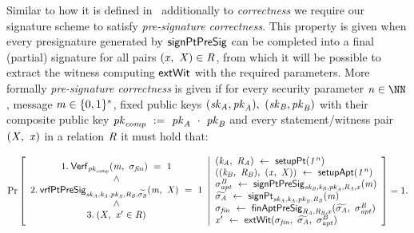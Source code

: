 \begin{definition}\label{def:preSigCorrectness}
Similar to how it is defined in~\cite{aumayr2020bitcoinchannels} additionally to \textit{correctness} we require our signature scheme to satisfy \textit{pre-signature correctness}.
This property is given when every presignature generated by $\mathsf{signPtPreSig}$ can be completed into a final (partial) signature for all pairs $(\mathit{x} ,~ \mathit{X}) \in \mathit{R}$, from which it will
be possible to extract the witness computing $\mathsf{extWit}$ with the required parameters.
More formally \textit{pre-signature correctness} is given if for every security parameter $\varN \in \cnstNatural$, message $\mathit{m} \in \{0,1\}^{*}$, fixed public keys $(\mathit{sk}_{\mathit{A}}, \mathit{pk}_{\mathit{A}}) ,~ (\mathit{sk}_{\mathit{B}}, \mathit{pk}_{\mathit{B}})$
with their composite public key $\mathit{pk}_{\mathit{comp}} ~:=~ \mathit{pk}_{\mathit{A}} ~\cdot~ \mathit{pk}_{\mathit{B}}$ and every statement/witness pair $(\mathit{X} ,~ \mathit{x})$ in a relation $\mathit{R}$ it must hold that:
\begin{scriptsize}
    \[
        \Pr\left[
        \begin{array}{c}
            1.\:\mathsf{Verf}_{\mathit{pk}_{\mathit{comp}}}(\mathit{m} ,~ \sigma_{\mathit{fin}}) ~=~ 1 \\
            ~\land~ \\
            2.\:\mathsf{vrfPtPreSig}_{\mathit{sk}_{\mathit{A}},\mathit{\mathit{k}_{\mathit{A}}},\mathit{pk}_{\mathit{B}},\mathit{R}_{\mathit{B}},\widetilde{\sigma_{\mathit{B}}}}(\mathit{m} ,~ \mathit{X}) ~=~ 1 \\
            ~\land~ \\
            3.\:(\mathit{X} ,~ \mathit{x}' \in \mathit{R})
        \end{array}
        \middle\vert
        \begin{array}{l}
            (\mathit{\mathit{k}_{\mathit{A}}} ,~ \mathit{R}_{\mathit{A}}) ~\leftarrow~ \mathsf{setupPt} (\mathit{1^n}) \\
            ((\mathit{\mathit{k}_{\mathit{B}}} ,~ \mathit{R}_{\mathit{B}}) ,~ (\mathit{x} ,~ \mathit{X})) ~\leftarrow~ \mathsf{setupApt}(\mathit{1^n}) \\
            \sigma^{\mathit{B}}_{\mathit{apt}} ~\leftarrow~ \mathsf{signPtPreSig}_{\mathit{sk}_{\mathit{B}},\mathit{\mathit{k}_{\mathit{B}}},\mathit{pk}_{\mathit{A}},\mathit{R}_{\mathit{A}},\mathit{x}}(\mathit{m}) \\
            \widetilde{\sigma_{\mathit{A}}} ~\leftarrow~ \mathsf{signPt}_{\mathit{sk}_{\mathit{A}},\mathit{\mathit{k}_{\mathit{A}}},\mathit{pk}_{\mathit{B}},\mathit{R}_{\mathit{B}}}(\mathit{m}) \\
            \sigma_{\mathit{fin}} ~\leftarrow~ \mathsf{finAptPreSig}_{\mathit{R}_{\mathit{A}},\mathit{R}_{\mathit{B}},\mathit{x}}(\widetilde{\sigma_{\mathit{A}}} ,~ \sigma^{\mathit{B}}_{\mathit{apt}}) \\
            \mathit{x}' ~\leftarrow~ \mathsf{extWit}(\sigma_{\mathit{fin}} ,~ \widetilde{\sigma_{\mathit{A}}} ,~ \sigma^{\mathit{B}}_{\mathit{apt}})
        \end{array}
        \right]=1.
    \]
\end{scriptsize}
\end{definition}


